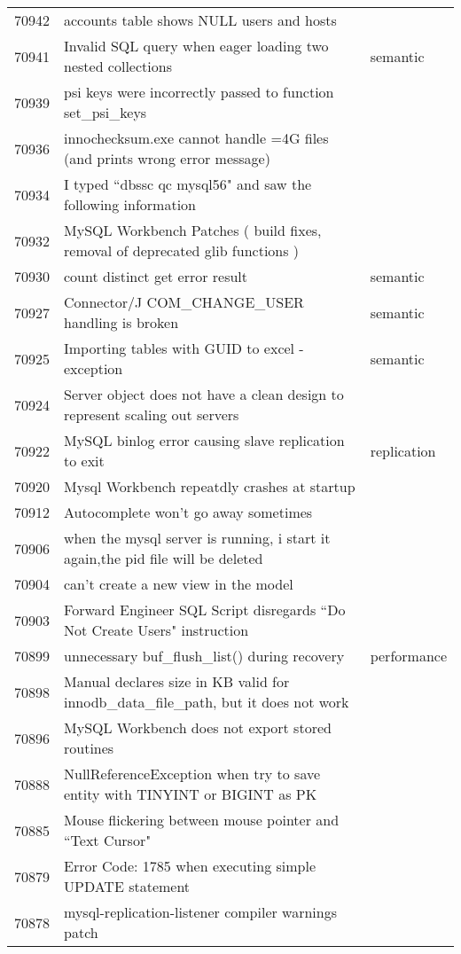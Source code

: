 \begin{longtable}[c]{p{1cm}p{8cm}p{3cm}}
70942 & accounts table shows NULL users and hosts &  \\
70941 & Invalid SQL query when eager loading two nested collections & semantic \\
70939 & psi keys were incorrectly passed to function set\_psi\_keys &  \\
70936 & innochecksum.exe cannot handle =4G files (and prints wrong error message) &  \\
70934 & I typed ``dbssc qc mysql56" and saw the following information &  \\
70932 & MySQL Workbench Patches ( build fixes, removal of deprecated glib functions ) &  \\
70930 & count distinct get error result & semantic \\
70927 & Connector/J COM\_CHANGE\_USER handling is broken & semantic \\
70925 & Importing tables with GUID to excel - exception & semantic \\
70924 & Server object does not have a clean design to represent scaling out servers &  \\
70922 & MySQL binlog error causing slave replication to exit & replication \\
70920 & Mysql Workbench repeatdly crashes at startup &  \\
70912 & Autocomplete won't go away sometimes &  \\
70906 & when the mysql server is running, i start it again,the pid file will be deleted &  \\
70904 & can't create a new view in the model &  \\
70903 & Forward Engineer SQL Script disregards ``Do Not Create Users" instruction &  \\
70899 & unnecessary buf\_flush\_list() during recovery & performance \\
70898 & Manual declares size in KB valid for innodb\_data\_file\_path, but it does not work &  \\
70896 & MySQL Workbench does not export stored routines &  \\
70888 & NullReferenceException when try to save entity with TINYINT or BIGINT as PK &  \\
70885 & Mouse flickering between mouse pointer and ``Text Cursor" &  \\
70879 & Error Code: 1785 when executing simple UPDATE statement &  \\
70878 & mysql-replication-listener compiler warnings patch &  \\

\end{longtable}

